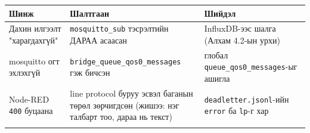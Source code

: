 \begingroup\scriptsize\begin{longtable}[]{@{}lll@{}}
\toprule
\begin{minipage}[b]{0.30\columnwidth}\raggedright
Шинж\strut
\end{minipage} & \begin{minipage}[b]{0.30\columnwidth}\raggedright
Шалтгаан\strut
\end{minipage} & \begin{minipage}[b]{0.30\columnwidth}\raggedright
Шийдэл\strut
\end{minipage}\tabularnewline
\midrule
\endhead
\begin{minipage}[t]{0.30\columnwidth}\raggedright
Дахин илгээлт "харагдахгүй"\strut
\end{minipage} & \begin{minipage}[t]{0.30\columnwidth}\raggedright
\texttt{mosquitto\_sub} тэсрэлтийн ДАРАА асаасан\strut
\end{minipage} & \begin{minipage}[t]{0.30\columnwidth}\raggedright
InfluxDB-ээс шалга (Алхам 4.2-ын урхи)\strut
\end{minipage}\tabularnewline
\begin{minipage}[t]{0.30\columnwidth}\raggedright
mosquitto огт эхлэхгүй\strut
\end{minipage} & \begin{minipage}[t]{0.30\columnwidth}\raggedright
\texttt{bridge\_\allowbreak{}queue\_\allowbreak{}qos0\_\allowbreak{}messages} гэж бичсэн\strut
\end{minipage} & \begin{minipage}[t]{0.30\columnwidth}\raggedright
глобал \texttt{queue\_\allowbreak{}qos0\_\allowbreak{}messages}-ыг ашигла\strut
\end{minipage}\tabularnewline
\begin{minipage}[t]{0.30\columnwidth}\raggedright
Node-RED \texttt{400} буцаана\strut
\end{minipage} & \begin{minipage}[t]{0.30\columnwidth}\raggedright
line protocol буруу эсвэл баганын төрөл зөрчигдсөн (жишээ: нэг талбарт тоо, дараа нь текст)\strut
\end{minipage} & \begin{minipage}[t]{0.30\columnwidth}\raggedright
\texttt{deadletter.jsonl}-ийн \texttt{error} ба \texttt{lp}-г хар\strut
\end{minipage}\tabularnewline
\begin{minipage}[t]{0.30\columnwidth}\raggedright

\end{minipage}
\end{longtable}
